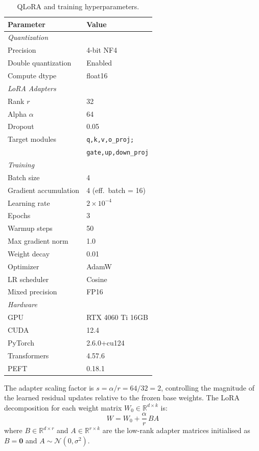 \documentclass[twocolumn]{article}
\begin{document}
\begin{table}[h]
\centering
\caption{QLoRA and training hyperparameters.}
\label{tab:qlora_config}
\begin{tabular}{ll}
\toprule
\textbf{Parameter} & \textbf{Value} \\
\midrule
\multicolumn{2}{l}{\textit{Quantization}} \\
Precision & 4-bit NF4 \\
Double quantization & Enabled \\
Compute dtype & float16 \\
\midrule
\multicolumn{2}{l}{\textit{LoRA Adapters}} \\
Rank $r$ & 32 \\
Alpha $\alpha$ & 64 \\
Dropout & 0.05 \\
Target modules & \texttt{q,k,v,o\_proj;} \\
 & \texttt{gate,up,down\_proj} \\
\midrule
\multicolumn{2}{l}{\textit{Training}} \\
Batch size & 4 \\
Gradient accumulation & 4 (eff.\ batch = 16) \\
Learning rate & $2 \times 10^{-4}$ \\
Epochs & 3 \\
Warmup steps & 50 \\
Max gradient norm & 1.0 \\
Weight decay & 0.01 \\
Optimizer & AdamW \\
LR scheduler & Cosine \\
Mixed precision & FP16 \\
\midrule
\multicolumn{2}{l}{\textit{Hardware}} \\
GPU & RTX 4060 Ti 16GB \\
CUDA & 12.4 \\
PyTorch & 2.6.0+cu124 \\
Transformers & 4.57.6 \\
PEFT & 0.18.1 \\
\bottomrule
\end{tabular}
\end{table}

The adapter scaling factor is $s = \alpha / r = 64/32 = 2$, controlling the
magnitude of the learned residual updates relative to the frozen base weights.
The LoRA decomposition for each weight matrix $W_0 \in \mathbb{R}^{d \times k}$ is:
\begin{equation}
  W = W_0 + \frac{\alpha}{r} \, B A
  \label{eq:lora}
\end{equation}
where $B \in \mathbb{R}^{d \times r}$ and $A \in \mathbb{R}^{r \times k}$ are the
low-rank adapter matrices initialised as $B = \mathbf{0}$ and $A \sim \mathcal{N}(0, \sigma^2)$.
\end{document}
